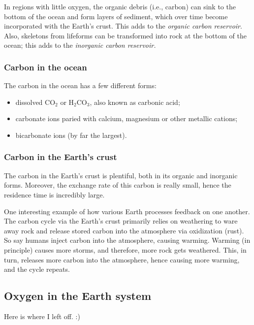 \documentclass[11pt]{article}
\numberwithin{equation}{section}
\begin{document}
\par 

In regions with little oxygen, the organic debris (i.e., carbon) can sink to the bottom of the ocean and form layers of sediment, which over time become incorporated with the Earth's crust. This adds to the \textit{organic carbon reservoir}. Also, skeletons from lifeforms can be transformed into rock at the bottom of the ocean; this adds to the \textit{inorganic carbon reservoir.}

\subsubsection{Carbon in the ocean}

The carbon in the ocean has a few different forms:
\begin{itemize}
\item dissolved CO$_2$ or H$_2$CO$_3$, also known as carbonic acid;
\item carbonate ions paried with calcium, magnesium or other metallic cations;
\item bicarbonate ions (by far the largest).
\end{itemize}


\subsubsection{Carbon in the Earth's crust}

The carbon in the Earth's crust is plentiful, both in its organic and inorganic forms. Moreover, the exchange rate of this carbon is really small, hence the residence time is incredibly large. 

One interesting example of how various Earth processes feedback on one another. The carbon cycle via the Earth's crust primarily relies on weathering to ware away rock and release stored carbon into the atmosphere via oxidization (rust). So say humans inject carbon into the atmosphere, causing warming. Warming (in principle) causes more storms, and therefore, more rock gets weathered. This, in turn, releases more carbon into the atmosphere, hence causing more warming, and the cycle repeats. 

\subsection{Oxygen in the Earth system}

Here is where I left off. :)
\end{document}
